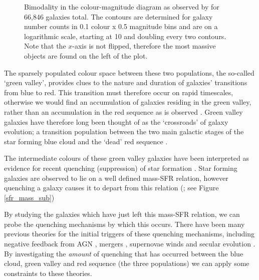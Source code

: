 \documentclass{mn2e}
\begin{document}
\begin{figure}
\caption{Bimodality in the colour-magnitude diagram as observed by \citet{Baldry04} for 66,846 galaxies total. The contours are determined for galaxy number counts in 0.1 colour x 0.5 magnitude bins and are on a logarithmic scale, starting at 10 and doubling every two contours. Note that the $x$-axis is not flipped, therefore the most massive objects are found on the left of the plot.}
\label{baldry}
\end{figure}


The sparsely populated colour space between these two populations, the so-called `green valley', provides clues to the nature and duration of galaxies' transitions from blue to red. This transition must therefore occur on rapid timescales, otherwise we would find an accumulation of galaxies residing in the green valley, rather than an accumulation in the red sequence as is observed \citep{Arnouts07, Martin07}. Green valley galaxies have therefore long been thought of as the `crossroads' of galaxy evolution; a transition population between the two main galactic stages of the star forming blue cloud and the `dead' red sequence \citep{Bell04, Wyder07, Schim07, Martin07, Faber07, Mendez11, Gonc12, Sch2014}. 

The intermediate colours of these green valley galaxies have been interpreted as evidence for recent quenching (suppression) of star formation \citep{Salim07}. Star forming galaxies are observed to lie on a well defined mass-SFR relation, however quenching a galaxy causes it to depart from this relation (\citealt{Noeske07, Peng}; see Figure \ref{sfr_mass_sub})

By studying the galaxies which  have just left this mass-SFR relation, we can probe the quenching mechanisms by which this occurs. There have been many previous theories for the initial triggers of these quenching mechanisms, including negative feedback from AGN \citep{Sch07}, mergers \citep{Darg10a}, supernovae winds \citep{MFB12} and secular evolution \citep{Masters10, Masters11}. By investigating the \emph{amount} of quenching that has occurred between the blue cloud, green valley and red sequence (the three populations) we can apply some constraints to these theories. 
\end{document}
